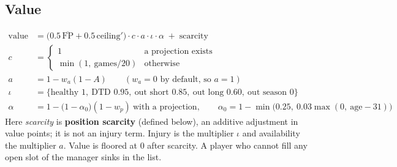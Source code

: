 \documentclass[10pt]{article}
\begin{document}
\subsection{Value}
\begin{align}
\text{value} &= \big(0.5\,\overline{\mathrm{FP}} + 0.5\,\text{ceiling}'\big)\cdot c\cdot a\cdot \iota\cdot \alpha \;+\; \text{scarcity}\\
c &= \begin{cases}1 & \text{a projection exists}\\ \min(1,\ \text{games}/20) & \text{otherwise}\end{cases}\\
a &= 1-w_a(1-A)\qquad(w_a=0\text{ by default, so }a=1)\\
\iota &= \{\text{healthy }1,\ \text{DTD }0.95,\ \text{out short }0.85,\ \text{out long }0.60,\ \text{out season }0\}\\
\alpha &= 1-\big(1-\alpha_0\big)(1-w_p)\ \text{with a projection},\qquad \alpha_0 = 1-\min\!\big(0.25,\ 0.03\max(0,\ \text{age}-31)\big)
\end{align}
Here \emph{scarcity} is \textbf{position scarcity} (defined below), an additive adjustment in value points; it is not
an injury term. Injury is the multiplier $\iota$ and availability the multiplier $a$. Value is floored at 0 after
scarcity. A player who cannot fill any open slot of the manager sinks in the list.
\end{document}

